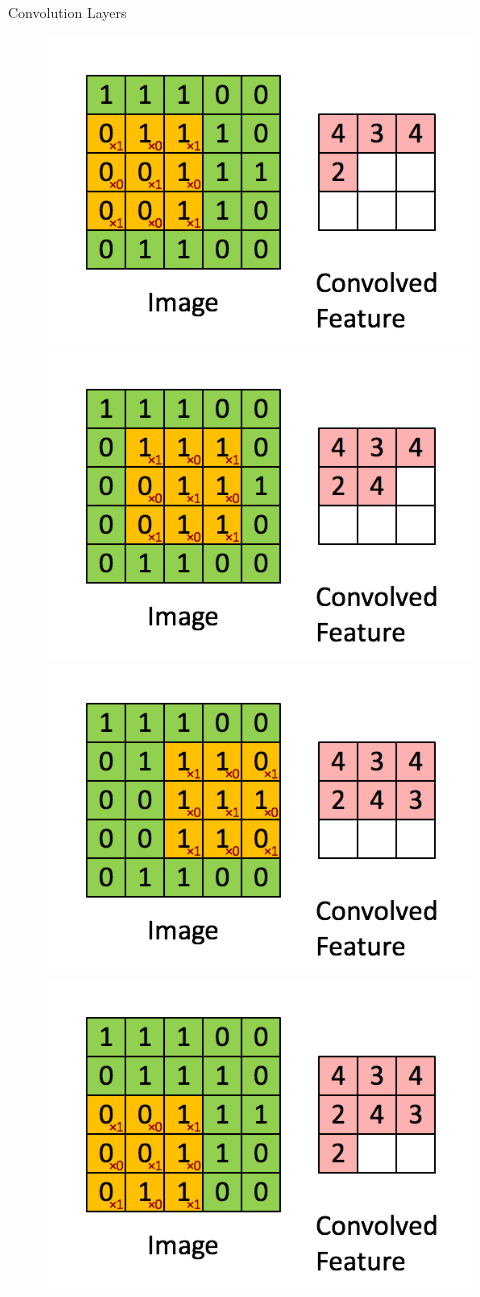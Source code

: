 \documentclass{beamer}
\begin{document}
\begin{frame}[fragile]{Convolution Layers}
\begin{figure}
\begin{overprint}
            \centering\includegraphics[width=.7\textwidth,height=\textheight,keepaspectratio]{figures/Convolution/Convolution-3.png}
            \centering\includegraphics[width=.7\textwidth,height=\textheight,keepaspectratio]{figures/Convolution/Convolution-4.png}
            \centering\includegraphics[width=.7\textwidth,height=\textheight,keepaspectratio]{figures/Convolution/Convolution-5.png}
            \centering\includegraphics[width=.7\textwidth,height=\textheight,keepaspectratio]{figures/Convolution/Convolution-6.png}

\end{overprint}
\end{figure}
\end{frame}
\end{document}
